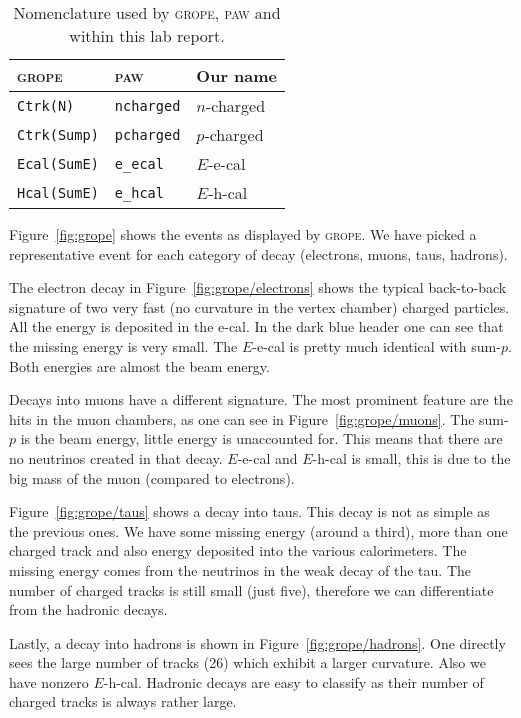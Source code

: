 \documentclass[11pt, english, fleqn, DIV=15, headinclude, BCOR=2cm]{scrreprt}
\newcommand\ecal{e-cal}
\newcommand\eecal{$E$-e-cal}
\newcommand\ehcal{$E$-h-cal}
\newcommand\sump{sum-$p$}
\newcommand\pcharged{$p$-charged}
\newcommand\ncharged{$n$-charged}
\begin{document}
\begin{table}
    \centering
    \begin{tabular}{lll}
        \toprule
        \textsc{grope}
        & \textsc{paw}
        & Our name \\
        \midrule
        \texttt{Ctrk(N)} & \texttt{ncharged} & \ncharged\ \\
        \texttt{Ctrk(Sump)} & \texttt{pcharged} & \pcharged\ \\
        \texttt{Ecal(SumE)} & \texttt{e\_ecal} & \eecal\ \\
        \texttt{Hcal(SumE)} & \texttt{e\_hcal} & \ehcal\ \\
        \bottomrule
    \end{tabular}
    \caption{%
        Nomenclature used by \textsc{grope}, \textsc{paw} and within this lab
        report.
    }
    \label{tab:nomenclature}
\end{table}

Figure~\ref{fig:grope} shows the events as displayed by \textsc{grope}. We have
picked a representative event for each category of decay (electrons, muons,
taus, hadrons).



The electron decay in Figure~\ref{fig:grope/electrons} shows the typical
back-to-back signature of two very fast (no curvature in the vertex chamber)
charged particles. All the energy is deposited in the \ecal{}. In the dark blue
header one can see that the missing energy is very small. The \eecal{} is
pretty much identical with \sump{}. Both energies are almost the beam energy.

Decays into muons have a different signature. The most prominent feature are
the hits in the muon chambers, as one can see in Figure~\ref{fig:grope/muons}.
The \sump{} is the beam energy, little energy is unaccounted for. This means
that there are no neutrinos created in that decay. \eecal{} and \ehcal{} is
small, this is due to the big mass of the muon (compared to electrons).

Figure~\ref{fig:grope/taus} shows a decay into taus. This decay is not as
simple as the previous ones. We have some missing energy (around a third), more
than one charged track and also energy deposited into the various calorimeters.
The missing energy comes from the neutrinos in the weak decay of the tau. The
number of charged tracks is still small (just five), therefore we can
differentiate from the hadronic decays.

Lastly, a decay into hadrons is shown in Figure~\ref{fig:grope/hadrons}. One
directly sees the large number of tracks (26) which exhibit a larger curvature.
Also we have nonzero \ehcal{}. Hadronic decays are easy to classify as their
number of charged tracks is always rather large.
\end{document}
